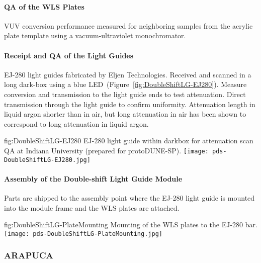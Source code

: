 \paragraph*{QA of the WLS Plates}

VUV conversion performance measured for neighboring samples from the 
acrylic plate template using a vacuum-ultraviolet monochromator.

\paragraph*{Receipt and QA of the Light Guides}

EJ-280 light guides fabricated by Eljen Technologies. Received and scanned in a 
long dark-box using a blue LED~(Figure~\ref{fig:DoubleShiftLG-EJ280}).
 Measure conversion and transmission to the light guide ends to test attenuation. 
Direct transmission through the light guide to confirm uniformity. 
Attenuation length in liquid argon shorter than in air, but long attenuation in 
air has been shown to correspond to long attenuation in liquid argon.

\begin{dunefigure}{fig:DoubleShiftLG-EJ280}
{EJ-280 light guide within darkbox for attenuation scan QA at Indiana University (prepared for protoDUNE-SP).}
  \texttt{[image: pds-DoubleShiftLG-EJ280.jpg]}
\end{dunefigure}

\paragraph*{Assembly of the Double-shift Light Guide Module}

Parts are shipped to the assembly point where the EJ-280 light guide is mounted 
into the module frame and the WLS plates are attached.

\begin{dunefigure}{fig:DoubleShiftLG-PlateMounting}
{Mounting of the WLS plates to the EJ-280 bar.}
  \texttt{[image: pds-DoubleShiftLG-PlateMounting.jpg]}
\end{dunefigure}


\subsubsection{\color{red}\bf ARAPUCA}
\label{ssec:fdsp-pd-pc-prod-arapuca}



